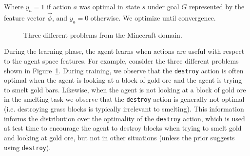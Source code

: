 \documentclass[11pt]{article}
\begin{document}
Where $y_a = 1$ if action $a$ was optimal in state $s$ under goal $G$ represented by the feature vector $\vec{\phi}$, and $y_a = 0$ otherwise. We optimize until convergence.

\begin{figure}
\centering
{}
  \caption{Three different problems from the Minecraft domain.}
  \label{fig:minecraft}
\end{figure}

During the learning phase, the agent learns when actions are useful
with respect to the agent space features.  For example, consider the three different
problems shown in Figure~\ref{fig:minecraft}.  During training, we observe
that the \texttt{destroy} action is often optimal when the agent is
looking at a block of gold ore and the agent is trying to smelt gold
bars.  Likewise, when the agent is not looking at a block of gold
ore in the smelting task we observe that the \texttt{destroy} action
is generally not optimal (i.e. destroying grass blocks is typically
irrelevant to smelting).  This information informs the distribution
over the optimality of the \texttt{destroy} action, which is used at
test time to encourage the agent to destroy blocks when trying to
smelt gold and looking at gold ore, but not in other situations
(unless the prior suggests using \texttt{destroy}).
\end{document}
